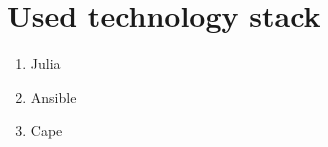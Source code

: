 \chapter{Used technology stack} \label{app:technologies}
\begin{enumerate}
    \item Julia
    \item Ansible
    \item Cape
\end{enumerate}


